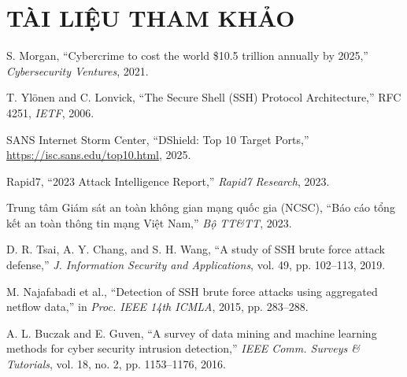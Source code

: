 \documentclass[13pt,a4paper,oneside]{report}
\begin{document}
\setcounter{page}{1}








\chapter*{TÀI LIỆU THAM KHẢO}

\begin{enumerate}[label={[\arabic*]}]

\item S. Morgan, ``Cybercrime to cost the world \$10.5 trillion annually by 2025,'' \textit{Cybersecurity Ventures}, 2021.

\item T. Ylönen and C. Lonvick, ``The Secure Shell (SSH) Protocol Architecture,'' RFC 4251, \textit{IETF}, 2006.

\item SANS Internet Storm Center, ``DShield: Top 10 Target Ports,'' \url{https://isc.sans.edu/top10.html}, 2025.

\item Rapid7, ``2023 Attack Intelligence Report,'' \textit{Rapid7 Research}, 2023.

\item Trung tâm Giám sát an toàn không gian mạng quốc gia (NCSC), ``Báo cáo tổng kết an toàn thông tin mạng Việt Nam,'' \textit{Bộ TT\&TT}, 2023.

\item D. R. Tsai, A. Y. Chang, and S. H. Wang, ``A study of SSH brute force attack defense,'' \textit{J. Information Security and Applications}, vol. 49, pp. 102--113, 2019.

\item M. Najafabadi et al., ``Detection of SSH brute force attacks using aggregated netflow data,'' in \textit{Proc. IEEE 14th ICMLA}, 2015, pp. 283--288.

\item A. L. Buczak and E. Guven, ``A survey of data mining and machine learning methods for cyber security intrusion detection,'' \textit{IEEE Comm. Surveys \& Tutorials}, vol. 18, no. 2, pp. 1153--1176, 2016.


\end{enumerate}
\end{document}
